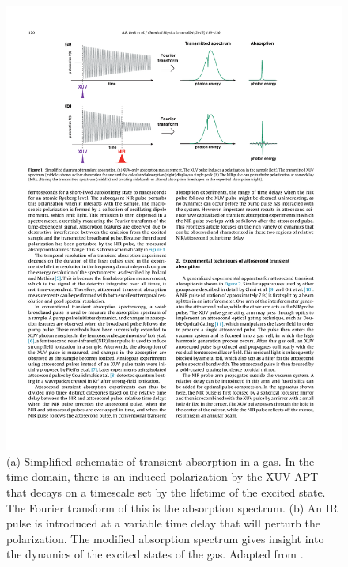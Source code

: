 \begin{figure}
	\centering
	\includegraphics[width=1.0\textwidth]{figures/Introduction/gas_TA_sketch.pdf}
	\caption[Schematic of transient absorption in a gas]{(a) Simplified schematic of transient absorption in a gas.  In the time-domain, there is an induced polarization by the XUV APT that decays on a timescale set by the lifetime of the excited state.  The Fourier transform of this is the absorption spectrum.  (b) An IR pulse is introduced at a variable time delay that will perturb the polarization.  The modified absorption spectrum gives insight into the dynamics of the excited states of the gas.  Adapted from \cite{beckProbingUltrafastDynamics2015}.}
	\label{fig:gas_TA_sketch}
\end{figure}

